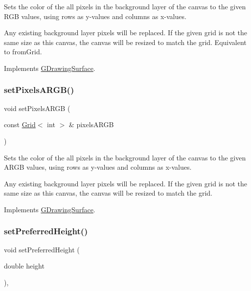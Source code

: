 Sets the color of the all pixels in the background layer of the canvas to the given R\+GB values, using rows as y-\/values and columns as x-\/values. 

Any existing background layer pixels will be replaced. If the given grid is not the same size as this canvas, the canvas will be resized to match the grid. Equivalent to from\+Grid. 

Implements \mbox{\hyperlink{classGDrawingSurface_aa80f4b7381bd418116baee600eed37fe}{G\+Drawing\+Surface}}.

\mbox{\label{classGCanvas_a64dd4bc93e7f6555e9d96b956602c7c8}} 
\subsubsection{\texorpdfstring{set\+Pixels\+A\+R\+G\+B()}{setPixelsARGB()}}
{\footnotesize\ttfamily void set\+Pixels\+A\+R\+GB (\begin{DoxyParamCaption}\item[{const \mbox{\hyperlink{classGrid}{Grid}}$<$ int $>$ \&}]{pixels\+A\+R\+GB }\end{DoxyParamCaption})\hspace{0.3cm}{\ttfamily [virtual]}}



Sets the color of the all pixels in the background layer of the canvas to the given A\+R\+GB values, using rows as y-\/values and columns as x-\/values. 

Any existing background layer pixels will be replaced. If the given grid is not the same size as this canvas, the canvas will be resized to match the grid. 

Implements \mbox{\hyperlink{classGDrawingSurface_a7d813f0f29751a217201f24cef402306}{G\+Drawing\+Surface}}.

\mbox{\label{classGInteractor_a1ab987704fce32098706c6f00fb08218}} 
\subsubsection{\texorpdfstring{set\+Preferred\+Height()}{setPreferredHeight()}}
{\footnotesize\ttfamily void set\+Preferred\+Height (\begin{DoxyParamCaption}\item[{double}]{height }\end{DoxyParamCaption})\hspace{0.3cm}{\ttfamily [virtual]}, {\ttfamily [inherited]}}



